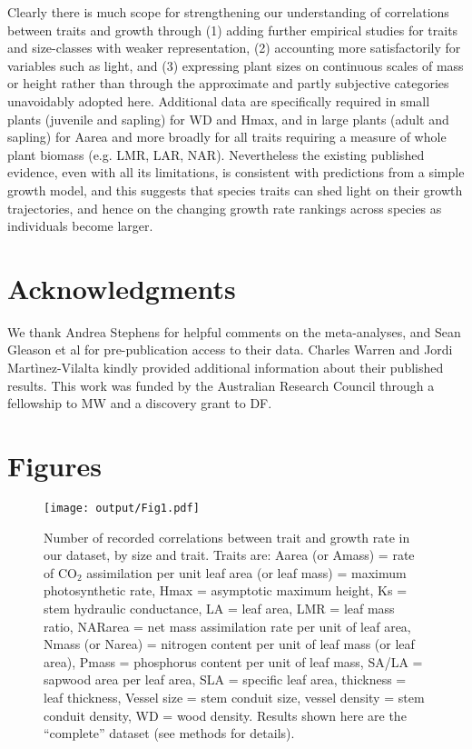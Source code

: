 \documentclass[a4paper,11pt]{article}
\begin{document}
Clearly there is much scope for strengthening our understanding of correlations between traits and growth through (1) adding further empirical studies for traits and size-classes with weaker representation, (2) accounting more satisfactorily for variables such as light, and (3) expressing plant sizes on continuous scales of mass or height rather than through the approximate and partly subjective categories unavoidably adopted here. Additional data are specifically required in small plants (juvenile and sapling) for WD and Hmax, and in large plants (adult and sapling) for Aarea and more broadly for all traits requiring a measure of whole plant biomass (e.g. LMR, LAR, NAR). Nevertheless the existing published evidence, even with all its limitations, is consistent with predictions from a simple growth model, and this suggests that species traits can shed light on their growth trajectories, and hence on the changing growth rate rankings across species as individuals become larger.

\section*{Acknowledgments}\label{Acknowledgment}

We thank Andrea Stephens for helpful comments on the meta-analyses, and Sean Gleason et al for pre-publication access to their data. Charles Warren and Jordi Martìnez-Vilalta kindly provided additional information about their published results. This work was funded by the Australian Research Council through a fellowship to MW and a discovery grant to DF.

\clearpage
\linespread{1}

\nocite{*}

\label{references}


\clearpage
\section*{Figures}

\begin{figure}[h!]
\centering
\texttt{[image: output/Fig1.pdf]}
\caption{Number of recorded correlations between trait and growth rate in our dataset, by size and trait. Traits are: Aarea (or Amass) = rate of CO$_{2}$ assimilation per unit leaf area (or leaf mass) = maximum photosynthetic rate, Hmax = asymptotic maximum height,  Ks = stem hydraulic conductance, LA = leaf area, LMR = leaf mass ratio, NARarea = net mass assimilation rate per unit of leaf area, Nmass (or Narea) = nitrogen content per unit of leaf mass (or leaf area), Pmass = phosphorus content per unit of leaf mass, SA/LA = sapwood area per leaf area, SLA = specific leaf area, thickness = leaf thickness, Vessel size = stem conduit size, vessel density = stem conduit density, WD = wood density. Results shown here are the ``complete'' dataset (see methods for details).}
\label{fig:fig1}
\end{figure}
\end{document}
